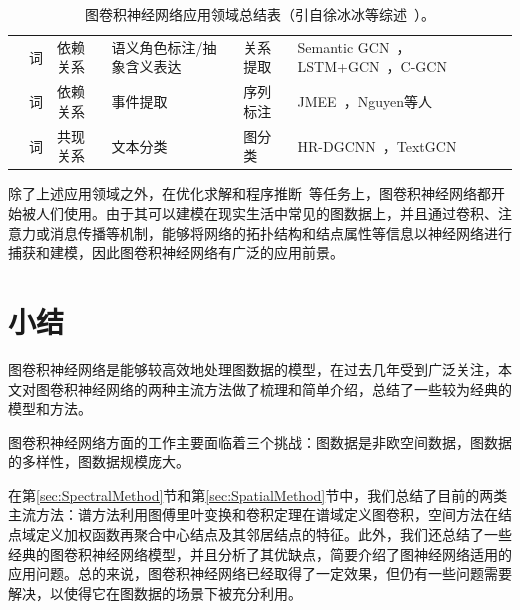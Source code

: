 \documentclass[final]{cvpr}
\begin{document}
\begin{table}[htbp!]
\begin{tabularx}{\textwidth}{XXXp{3cm}Xp{5cm}}
        & 词   & 依赖关系  & 语义角色标注/\newline 抽象含义表达  & 关系提取 & 
        Semantic GCN~\cite{marcheggiani2018exploiting}，\newline LSTM+GCN~\cite{marcheggiani2017encoding}，C-GCN~\cite{zhang2018graph}
        \\ 
        & 词   & 依赖关系  & 事件提取  & 序列标注 & 
        JMEE~\cite{liu2018jointly}，Nguyen等人~\cite{nguyen2018graph}
        \\ 
        & 词   & 共现关系  & 文本分类  & 图分类 & 
        HR-DGCNN~\cite{peng2018large}，TextGCN~\cite{yao2019graph}
        \\ 
    \bottomrule
    \end{tabularx}
    \caption{图卷积神经网络应用领域总结表（引自徐冰冰等综述~\cite{徐冰冰2020图卷积神经网络综述}）。}\label{tab:apply-sum}
\end{table}

除了上述应用领域之外，在优化求解和程序推断~\cite{khalil2017learning,li2018combinatorial}等任务上，图卷积神经网络都开始被人们使用。由于其可以建模在现实生活中常见的图数据上，并且通过卷积、注意力或消息传播等机制，能够将网络的拓扑结构和结点属性等信息以神经网络进行捕获和建模，因此图卷积神经网络有广泛的应用前景。











\section{小结}\label{sec:Conclusion}

图卷积神经网络是能够较高效地处理图数据的模型，在过去几年受到广泛关注，本文对图卷积神经网络的两种主流方法做了梳理和简单介绍，总结了一些较为经典的模型和方法。

图卷积神经网络方面的工作主要面临着三个挑战：图数据是非欧空间数据，图数据的多样性，图数据规模庞大。

在第\ref{sec:SpectralMethod}节和第\ref{sec:SpatialMethod}节中，我们总结了目前的两类主流方法：谱方法利用图傅里叶变换和卷积定理在谱域定义图卷积，空间方法在结点域定义加权函数再聚合中心结点及其邻居结点的特征。此外，我们还总结了一些经典的图卷积神经网络模型，并且分析了其优缺点，简要介绍了图神经网络适用的应用问题。总的来说，图卷积神经网络已经取得了一定效果，但仍有一些问题需要解决，以使得它在图数据的场景下被充分利用。
\end{document}

